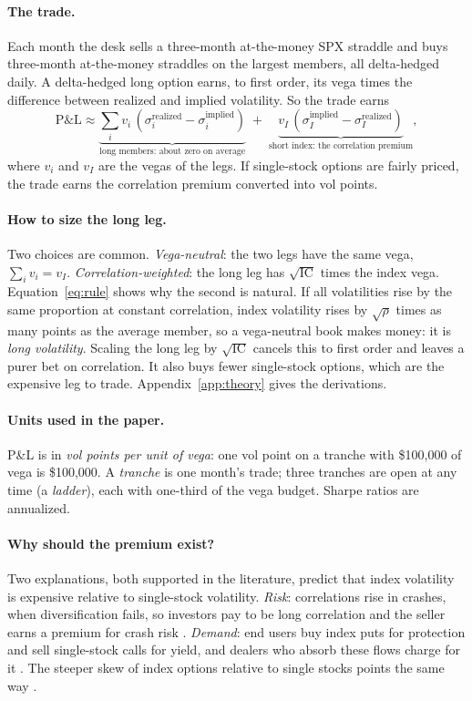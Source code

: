 \paragraph{The trade.} Each month the desk sells a three-month at-the-money SPX straddle and buys three-month at-the-money straddles on the largest members, all delta-hedged daily. A delta-hedged long option earns, to first order, its vega times the difference between realized and implied volatility. So the trade earns
\begin{equation}\label{eq:pnl}
  \text{P\&L} \approx \underbrace{\textstyle\sum_i v_i\,(\sigma_i^{\text{realized}} - \sigma_i^{\text{implied}})}_{\text{long members: about zero on average}}
  \;+\; \underbrace{v_I\,(\sigma_I^{\text{implied}} - \sigma_I^{\text{realized}})}_{\text{short index: the correlation premium}},
\end{equation}
where $v_i$ and $v_I$ are the vegas of the legs. If single-stock options are fairly priced, the trade earns the correlation premium converted into vol points.

\paragraph{How to size the long leg.} Two choices are common. \emph{Vega-neutral}: the two legs have the same vega, $\sum_i v_i = v_I$. \emph{Correlation-weighted}: the long leg has $\sqrt{\text{IC}}$ times the index vega. Equation~\eqref{eq:rule} shows why the second is natural. If all volatilities rise by the same proportion at constant correlation, index volatility rises by $\sqrt{\rho}$ times as many points as the average member, so a vega-neutral book makes money: it is \emph{long volatility}. Scaling the long leg by $\sqrt{\text{IC}}$ cancels this to first order and leaves a purer bet on correlation. It also buys fewer single-stock options, which are the expensive leg to trade. Appendix~\ref{app:theory} gives the derivations.

\paragraph{Units used in the paper.} P\&L is in \emph{vol points per unit of vega}: one vol point on a tranche with \$100{,}000 of vega is \$100{,}000. A \emph{tranche} is one month's trade; three tranches are open at any time (a \emph{ladder}), each with one-third of the vega budget. Sharpe ratios are annualized.

\paragraph{Why should the premium exist?} Two explanations, both supported in the literature, predict that index volatility is expensive relative to single-stock volatility. \emph{Risk}: correlations rise in crashes, when diversification fails, so investors pay to be long correlation and the seller earns a premium for crash risk \citep{DMV2009}. \emph{Demand}: end users buy index puts for protection and sell single-stock calls for yield, and dealers who absorb these flows charge for it \citep{BollenWhaley2004, GPP2009}. The steeper skew of index options relative to single stocks points the same way \citep{BKM2003}.

